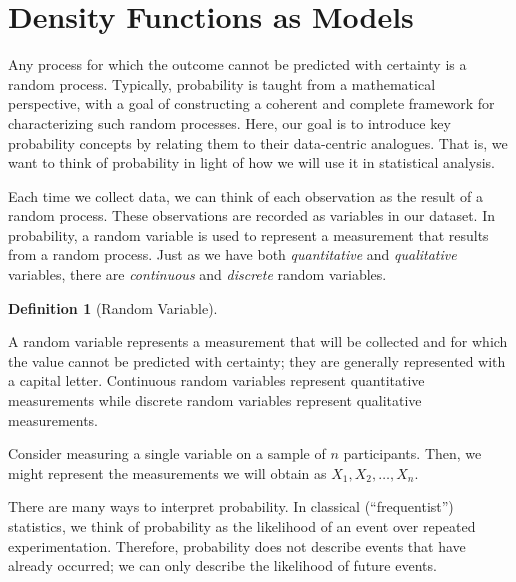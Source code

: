 \documentclass[
  letterpaper,
  DIV=11,
  numbers=noendperiod]{scrreprt}
\theoremstyle{definition}
\theoremstyle{definition}
\newtheorem{definition}{Definition}[chapter]
\theoremstyle{remark}
\begin{document}
\hypertarget{density-functions-as-models}{%
\section{Density Functions as
Models}\label{density-functions-as-models}}

Any process for which the outcome cannot be predicted with certainty is
a random process. Typically, probability is taught from a mathematical
perspective, with a goal of constructing a coherent and complete
framework for characterizing such random processes. Here, our goal is to
introduce key probability concepts by relating them to their
data-centric analogues. That is, we want to think of probability in
light of how we will use it in statistical analysis.

Each time we collect data, we can think of each observation as the
result of a random process. These observations are recorded as variables
in our dataset. In probability, a random variable is used to represent a
measurement that results from a random process. Just as we have both
\emph{quantitative} and \emph{qualitative} variables, there are
\emph{continuous} and \emph{discrete} random variables.

\begin{definition}[Random
Variable]\protect\hypertarget{def-random-variable}{}\label{def-random-variable}

A random variable represents a measurement that will be collected and
for which the value cannot be predicted with certainty; they are
generally represented with a capital letter. Continuous random variables
represent quantitative measurements while discrete random variables
represent qualitative measurements.

\end{definition}

Consider measuring a single variable on a sample of \(n\) participants.
Then, we might represent the measurements we will obtain as
\(X_1, X_2, \dots, X_n\).

\begin{tcolorbox}[enhanced jigsaw, bottomrule=.15mm, titlerule=0mm, bottomtitle=1mm, colback=white, coltitle=black, rightrule=.15mm, leftrule=.75mm, toprule=.15mm, toptitle=1mm, left=2mm, opacityback=0, colframe=quarto-callout-note-color-frame, breakable, title=\textcolor{quarto-callout-note-color}{\faInfo}\hspace{0.5em}{Note}, arc=.35mm, colbacktitle=quarto-callout-note-color!10!white, opacitybacktitle=0.6]

There are many ways to interpret probability. In classical
(``frequentist'') statistics, we think of probability as the likelihood
of an event over repeated experimentation. Therefore, probability does
not describe events that have already occurred; we can only describe the
likelihood of future events.

\end{tcolorbox}
\end{document}
